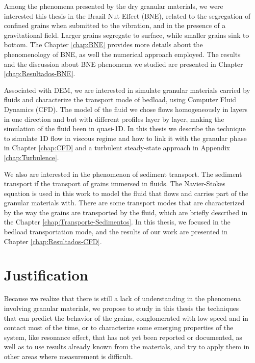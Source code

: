     Among the phenomena presented by the dry granular materials, we were interested this thesis in the Brazil Nut Effect (BNE), related to the segregation of confined grains when submitted to the vibration, and in the presence of a gravitational field. Larger grains segregate to surface, while smaller grains sink to bottom. The Chapter \ref{chap:BNE} provides more details about the phenomenology of BNE, as well the numerical approach employed. The results and the discussion about BNE phenomena we studied are presented in Chapter \ref{chap:Resultados-BNE}.

    Associated with DEM, we are interested in simulate granular materials carried by fluids and characterize the transport mode of bedload, using Computer Fluid Dynamics (CFD). The model of the fluid we chose flows homogeneously in layers in one direction and but with different profiles layer by layer, making the simulation of the fluid been in quasi-1D. In this thesis we describe the technique to simulate 1D flow in viscous regime and how to link it with the granular phase in Chapter \ref{chap:CFD} and a turbulent steady-state approach in Appendix \ref{chap:Turbulence}.

    We also are interested in the phenomenon of sediment transport. The sediment transport if the transport of grains immersed in fluids. The Navier-Stokes \cite{Physical_Hydrodynamics, Fluid_Mechanics} equation is used in this work to model the fluid that flows and carries part of the granular materials with. There are some transport modes that are characterized by the way the grains are transported by the fluid, which are briefly described in the Chapter \ref{chap:Transporte-Sedimentos}. In this thesis, we focused in the bedload transportation mode, and the results of our work are presented in Chapter \ref{chap:Resultados-CFD}.

\section{Justification}
\label{sec:justificativa}
    Because we realize that there is still a lack of understanding in the phenomena involving granular materials, we propose to study in this thesis the techniques that can predict the behavior of the grains, conglomerated with low speed and in contact most of the time, or to characterize some emerging properties of the system, like resonance effect, that has not yet been reported or documented, as well as to use results already known from the materials, and try to apply them in other areas where measurement is difficult.

